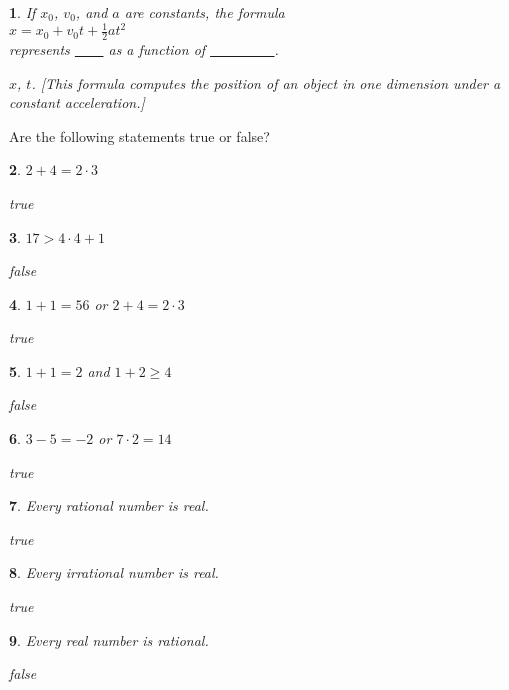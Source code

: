 \documentclass{amsbook}
\newtheorem{exc}{}
\newenvironment{ex}{\begin{exc}\normalfont}{\end{exc}}
\numberwithin{section}{chapter}
\numberwithin{equation}{chapter}
\begin{document}
\begin{multicols}{2}
\begin{ex}
	If $x_0$, $v_0$, and $a$ are constants, the formula \\$x = x_0+v_0t+ \frac{1}{2}a t^2$\\ represents \underline{\ \ \ \ } as a function of \underline{\ \ \ \ \ \ \ \ \ }.
	\begin{sol}
		$x$, $t$. [This formula computes the position of an object in one dimension under a constant acceleration.]
	\end{sol}
\end{ex}

\end{multicols}

Are the following statements true or false?
\begin{multicols}{2}
	\begin{ex}
		$2+4 = 2\cdot 3$
\begin{sol}
	true
\end{sol}
\end{ex}

	\begin{ex}
	$17 > 4\cdot 4+1$
	\begin{sol}
		false
	\end{sol}
\end{ex}

\begin{ex}
	$1+1=56$ or $2+4 = 2\cdot 3$
	\begin{sol}
		true
	\end{sol}
\end{ex}

\begin{ex}
	$1+1=2$ and $1+2\geq 4$
	\begin{sol}
		false
	\end{sol}
\end{ex}

\begin{ex}
	$3-5=-2$ or $7\cdot 2 = 14$
	\begin{sol}
		true
	\end{sol}
\end{ex}

\begin{ex}
	Every rational number is real.
	\begin{sol}
		true
	\end{sol}
\end{ex}


\begin{ex}
	Every irrational number is real.
	\begin{sol}
		true
	\end{sol}
\end{ex}



\begin{ex}
	Every real number is rational.
	\begin{sol}
		false
	\end{sol}
\end{ex}

\end{multicols}
\end{document}
